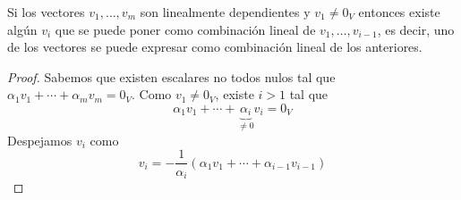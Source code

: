 \begin{lemma}
	Si los vectores \(v_1, \ldots, v_m \) son linealmente dependientes y \(v_1 \neq 0_{V }\) entonces existe algún \(v_i \) que se puede poner como combinación lineal de \(v_1, \ldots, v_{i-1}\), es decir, uno de los vectores se puede expresar como combinación lineal de los anteriores.
\end{lemma}
\begin{proof}
	Sabemos que existen escalares no todos nulos tal que \(\alpha_1 v_1 + \cdots + \alpha_m v_m = 0_V \). Como \(v_1 \neq 0_V \), existe \(i > 1 \) tal que
	\[
		\alpha_1 v_1 + \cdots + \underbrace{\alpha_i}_{\neq 0} v_i = 0_V
	\]
	Despejamos \(v_i \) como
	\[
		v_i = - \frac{1}{\alpha_i} (\alpha_1 v_1 + \cdots + \alpha_{i-1} v_{i-1})
	\]
\end{proof}

